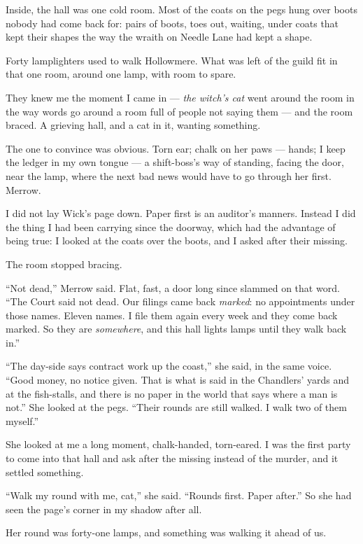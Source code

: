 Inside, the hall was one cold room. Most of the coats on the pegs hung over boots nobody had come back for: pairs of boots, toes out, waiting, under coats that kept their shapes the way the wraith on Needle Lane had kept a shape.

Forty lamplighters used to walk Hollowmere. What was left of the guild fit in that one room, around one lamp, with room to spare.

They knew me the moment I came in --- \emph{the witch's cat} went around the room in the way words go around a room full of people not saying them --- and the room braced. A grieving hall, and a cat in it, wanting something.

The one to convince was obvious. Torn ear; chalk on her paws --- hands; I keep the ledger in my own tongue --- a shift-boss's way of standing, facing the door, near the lamp, where the next bad news would have to go through her first. Merrow.

I did not lay Wick's page down. Paper first is an auditor's manners. Instead I did the thing I had been carrying since the doorway, which had the advantage of being true: I looked at the coats over the boots, and I asked after their missing.

The room stopped bracing.

``Not dead,'' Merrow said. Flat, fast, a door long since slammed on that word. ``The Court said not dead. Our filings came back \emph{marked}: no appointments under those names. Eleven names. I file them again every week and they come back marked. So they are \emph{somewhere}, and this hall lights lamps until they walk back in.''

``The day-side says contract work up the coast,'' she said, in the same voice. ``Good money, no notice given. That is what is said in the Chandlers' yards and at the fish-stalls, and there is no paper in the world that says where a man is not.'' She looked at the pegs. ``Their rounds are still walked. I walk two of them myself.''

She looked at me a long moment, chalk-handed, torn-eared. I was the first party to come into that hall and ask after the missing instead of the murder, and it settled something.

``Walk my round with me, cat,'' she said. ``Rounds first. Paper after.'' So she had seen the page's corner in my shadow after all.

\scenebreak

Her round was forty-one lamps, and something was walking it ahead of us.

